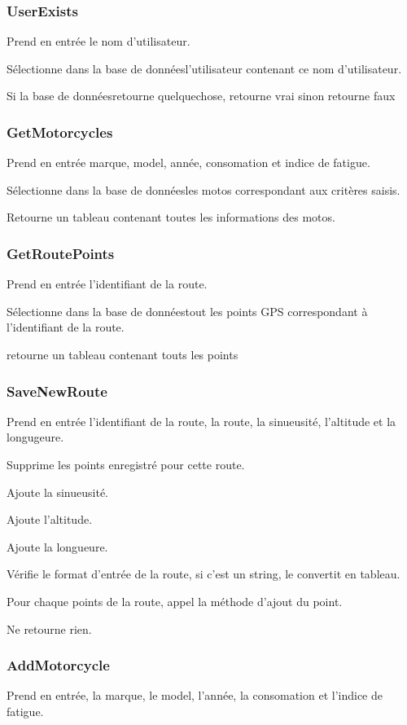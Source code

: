 \documentclass[a4paper]{article}
\newcommand{\bdd}{base de données}
\begin{document}
\subsubsection{UserExists}
Prend en entrée le nom d'utilisateur.

Sélectionne dans la \bdd l'utilisateur contenant ce nom d'utilisateur.

Si la \bdd retourne quelquechose, retourne vrai sinon retourne faux


\subsubsection{GetMotorcycles}
Prend en entrée marque, model, année, consomation et indice de fatigue.

Sélectionne dans la \bdd les motos correspondant aux critères saisis.

Retourne un tableau contenant toutes les informations des motos.

\subsubsection{GetRoutePoints}
Prend en entrée l'identifiant de la route.

Sélectionne dans la \bdd tout les points GPS correspondant à l'identifiant de la route.

retourne un tableau contenant touts les points

\subsubsection{SaveNewRoute}
Prend en entrée l'identifiant de la route, la route, la sinueusité, l'altitude et la longugeure.

Supprime les points enregistré pour cette route.

Ajoute la sinueusité.

Ajoute l'altitude.

Ajoute la longueure.

Vérifie le format d'entrée de la route, si c'est un string, le convertit en tableau.

Pour chaque points de la route, appel la méthode d'ajout du point.

Ne retourne rien.

\subsubsection{AddMotorcycle}
Prend en entrée, la marque, le model, l'année, la consomation et l'indice de fatigue.
\end{document}
